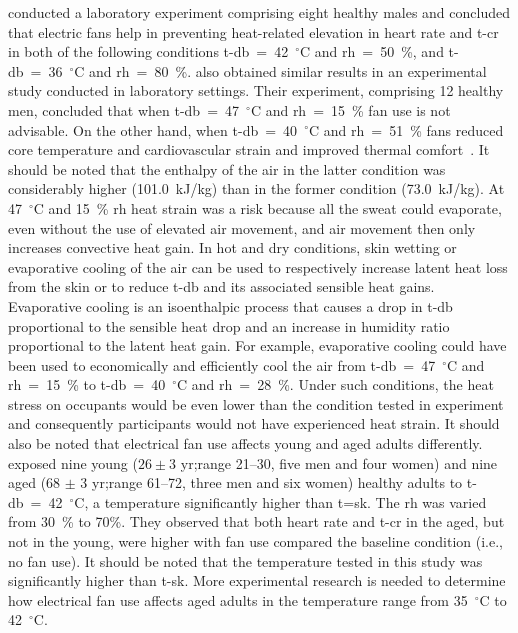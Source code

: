  conducted a laboratory experiment comprising eight healthy males and concluded that electric fans help in preventing heat-related elevation in heart rate and \ac{t-cr} in both of the following conditions \ac{t-db}~=~42~$^{\circ}$C and \ac{rh}~=~50~\%, and \ac{t-db}~=~36~$^{\circ}$C and \ac{rh}~=~80~\%.
 also obtained similar results in an experimental study conducted in laboratory settings.
Their experiment, comprising 12 healthy men, concluded that when \ac{t-db}~=~47~$^{\circ}$C and \ac{rh}~=~15~\% fan use is not advisable.
On the other hand, when \ac{t-db}~=~40~$^{\circ}$C and \ac{rh}~=~51~\% fans reduced core temperature and cardiovascular strain and improved thermal comfort~\cite{Morris2019}.
It should be noted that the enthalpy of the air in the latter condition was considerably higher (101.0~kJ/kg) than in the former condition (73.0~kJ/kg).
At 47~$^{\circ}$C and 15~\% \ac{rh} heat strain was a risk because all the sweat could evaporate, even without the use of elevated air movement, and air movement then only increases convective heat gain.
In hot and dry conditions, skin wetting or evaporative cooling of the air can be used to respectively increase latent heat loss from the skin or to reduce \ac{t-db} and its associated sensible heat gains.
Evaporative cooling is an isoenthalpic process that causes a drop in \ac{t-db} proportional to the sensible heat drop and an increase in humidity ratio proportional to the latent heat gain.
For example, evaporative cooling could have been used to economically and efficiently cool the air from \ac{t-db}~=~47~$^{\circ}$C and \ac{rh}~=~15~\% to \ac{t-db}~=~40~$^{\circ}$C and \ac{rh}~=~28~\%\@.
Under such conditions, the heat stress on occupants would be even lower than the condition tested in  experiment and consequently participants would not have experienced heat strain.
It should also be noted that electrical fan use affects young and aged adults differently.
 exposed nine young ($26 \pm 3$ yr;\@ range 21--30, five men and four women) and nine aged (68 $\pm$ 3 yr;\@ range 61--72, three men and six women) healthy adults to \ac{t-db}~=~42~$^{\circ}$C, a temperature significantly higher than \ac{t=sk}.
The \ac{rh} was varied from 30~\% to 70\%.
They observed that both heart rate and \ac{t-cr} in the aged, but not in the young, were higher with fan use compared the baseline condition (i.e., no fan use).
It should be noted that the temperature tested in this study was significantly higher than \ac{t-sk}.
More experimental research is needed to determine how electrical fan use affects aged adults in the temperature range from 35~$^{\circ}$C to 42~$^{\circ}$C\@.


